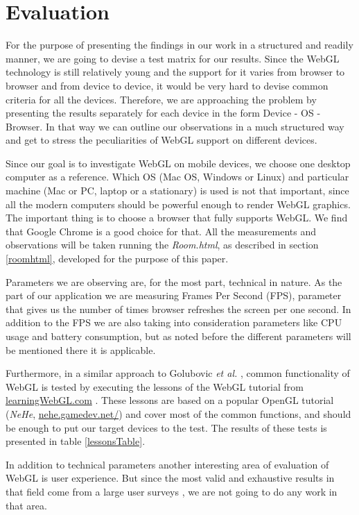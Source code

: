 \documentclass[12pt,journal,compsoc]{IEEEtran}
\begin{document}
\section{Evaluation}
For the purpose of presenting the findings in our work in a structured and readily manner, we are going to devise a test matrix for our results. Since the WebGL technology is still relatively young and the support for it varies from browser to browser and from device to device, it would be very hard to devise common criteria for all the devices. Therefore,  we are approaching the problem by presenting the results separately for each device in the form Device - OS - Browser. In that way we can outline our observations in a much structured way and get to stress the peculiarities of WebGL support on different devices.

Since our goal is to investigate WebGL on mobile devices, we choose one desktop computer as a reference. Which OS (Mac OS, Windows or Linux) and particular machine (Mac or PC, laptop or a stationary) is used is not that important, since all the modern computers should be powerful enough to render WebGL graphics. The important thing is to choose a browser that fully supports WebGL. We find that Google Chrome is a good choice for that. All the measurements and observations will be taken running the \textit{Room.html}, as described in section \ref{roomhtml}, developed for the purpose of this paper.

Parameters we are observing are, for the most part, technical in nature. As the part of our application we are measuring Frames Per Second (FPS), parameter that gives us the number of times browser refreshes the screen per one second. In addition to the FPS we are also taking into consideration parameters like CPU usage and battery consumption, but as noted before the different parameters will be mentioned there it is applicable. 

Furthermore, in a similar approach to Golubovic \textit{et al.} \cite{Golubovic2011}, common functionality of WebGL is tested by executing the lessons of the WebGL tutorial from \url{learningWebGL.com} \cite{learningwebgl}. These lessons are based on a popular OpenGL tutorial (\textit{NeHe}, \url{nehe.gamedev.net/}) and cover most of the common functions, and should be enough to put our target devices to the test. The results of these tests is presented in table \ref{lessonsTable}.
 
In addition to technical parameters another interesting area of evaluation of WebGL is user experience. But since the most valid and exhaustive results in that field come from a large user surveys  \cite{Olsson2011b}, we are not going to do any work in that area.
\end{document}
